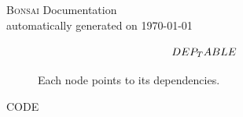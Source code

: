 \documentclass{article}
\begin{document}
    \begin{center}
        \LARGE
        \textsc{Bonsai} Documentation \\ 
        \vspace{0.1cm}
        \large
        automatically generated on \today
    \end{center}

    \begin{landscape}
        \footnotesize
        \begin{figure}
            $$
                \begin{tikzcd}
                    DEP_TABLE
                \end{tikzcd}
            $$
            \caption{Each node points to its dependencies.}
        \end{figure}
    \end{landscape}

    CODE
\end{document}
